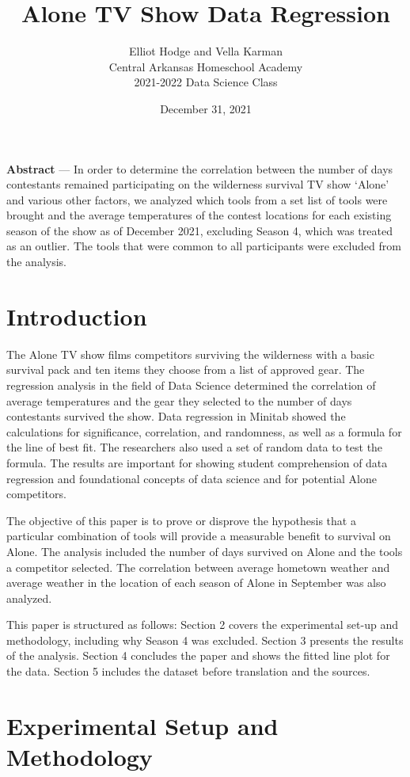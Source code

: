 \documentclass[letterpaper,twoside,11pt,twocolumn]{article}
\author{Elliot Hodge and Vella Karman\\\small{Central Arkansas Homeschool Academy}\small{\\2021-2022 Data Science Class}}
\date{December 31, 2021}
\title{\vspace{-2.2cm}Alone TV Show Data Regression}
\begin{document}
\maketitle

\noindent \textbf{Abstract} — In order to determine the correlation between the number of days contestants remained participating on the wilderness survival TV show ‘Alone’ and various other factors, we analyzed which tools from a set list of tools were brought and the average temperatures of the contest locations for each existing season of the show as of December 2021, excluding Season 4, which was treated as an outlier. The tools that were common to all participants were excluded from the analysis.

\section{Introduction}
\noindent The Alone TV show films competitors surviving the wilderness with a basic survival pack and ten items they choose from a list of approved gear. The regression analysis in the field of Data Science determined the correlation of average temperatures and the gear they selected to the number of days contestants survived the show. Data regression in Minitab showed the calculations for significance, correlation, and randomness, as well as a formula for the line of best fit. The researchers also used a set of random data to test the formula. The results are important for showing student comprehension of data regression and foundational concepts of data science and for potential Alone competitors.

The objective of this paper is to prove or disprove the hypothesis that a particular combination of tools will provide a measurable benefit to survival on Alone. The analysis included the number of days survived on Alone and the tools a competitor selected. The correlation between average hometown weather and average weather in the location of each season of Alone in September was also analyzed. 

This paper is structured as follows: Section 2 covers the experimental set-up and methodology, including why Season 4 was excluded. Section 3 presents the results of the analysis. Section 4 concludes the paper and shows the fitted line plot for the data. Section 5 includes the dataset before translation and the sources. 
\section{Experimental Setup and Methodology}
\end{document}
